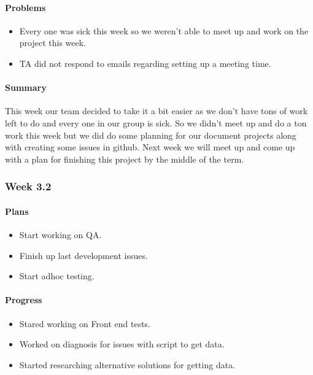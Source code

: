 \documentclass[onecolumn, draftclsnofoot,10pt, compsoc]{article}
\begin{document}
		    \paragraph{Problems} \hfill \break
		        \begin{itemize}
		            \item Every one was sick this week so we weren't able to meet up and work on the project this week.\\
		            \item TA did not respond to emails regarding setting up a meeting time.\\
		        \end{itemize}
		    \paragraph{Summary} \hfill \break
		    This week our team decided to take it a bit easier as we don't have tons of work left to do and every one in our group is sick. So we didn't meet up and do a ton work this week but we did do some planning for our document projects along with creating some issues in github. Next week we will meet up and come up with a plan for finishing this project by the middle of the term.\\
		    
        \subsubsection{Week 3.2}
		    \paragraph{Plans} \hfill \break
		        \begin{itemize}
		            \item Start working on QA.\\
		            \item Finish up last development issues.\\
		            \item Start adhoc testing.\\
		        \end{itemize}
		    \paragraph{Progress} \hfill \break
		        \begin{itemize}
		            \item Stared working on Front end tests.\\
		            \item Worked on diagnosis for issues with script to get data.\\
		            \item Started researching alternative solutions for getting data.\\
		        \end{itemize}
\end{document}
